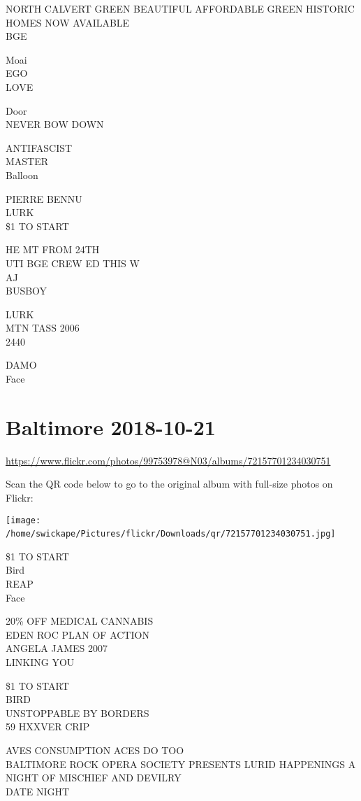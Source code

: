 \documentclass[10pt,letterpaper]{article}
\begin{document}
NORTH CALVERT GREEN BEAUTIFUL AFFORDABLE GREEN HISTORIC HOMES NOW AVAILABLE\\
BGE

Moai\\
EGO\\
LOVE

Door\\
NEVER BOW DOWN

ANTIFASCIST\\
MASTER\\
Balloon

PIERRE BENNU\\
LURK\\
\$1 TO START

HE MT FROM 24TH\\
UTI BGE CREW ED THIS W\\
AJ\\
BUSBOY

LURK\\
MTN TASS 2006\\
2440

DAMO\\
Face
\

\section*{Baltimore 2018-10-21}

\url{https://www.flickr.com/photos/99753978@N03/albums/72157701234030751}

Scan the QR code below to go to the original album with full-size photos on Flickr:

\texttt{[image: /home/swickape/Pictures/flickr/Downloads/qr/72157701234030751.jpg]}
\

\$1 TO START\\
Bird\\
REAP\\
Face

20\% OFF MEDICAL CANNABIS\\
EDEN ROC PLAN OF ACTION\\
ANGELA JAMES 2007\\
LINKING YOU

\$1 TO START\\
BIRD\\
UNSTOPPABLE BY BORDERS\\
59 HXXVER CRIP

AVES CONSUMPTION ACES DO TOO\\
BALTIMORE ROCK OPERA SOCIETY PRESENTS LURID HAPPENINGS A NIGHT OF MISCHIEF AND DEVILRY\\
DATE NIGHT
\end{document}
